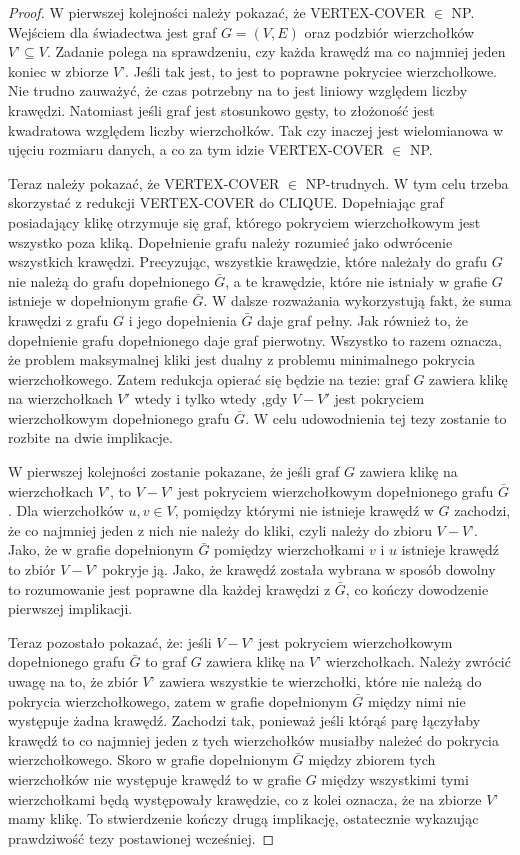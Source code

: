 \begin{proof}

W pierwszej kolejności należy pokazać, że VERTEX-COVER $\in$ NP. Wejściem dla świadectwa jest graf $G=(V,E)$ oraz podzbiór wierzchołków $V’ \subseteq V$. Zadanie polega na sprawdzeniu, czy każda krawędź ma co najmniej jeden koniec w zbiorze $V’$. Jeśli tak jest, to jest to poprawne pokryciee wierzchołkowe. Nie trudno zauważyć, że czas potrzebny na to jest liniowy względem liczby krawędzi. Natomiast jeśli graf jest stosunkowo gęsty, to złożoność jest kwadratowa względem liczby wierzchołków. Tak czy inaczej jest wielomianowa w ujęciu rozmiaru danych, a co za tym idzie VERTEX-COVER $\in$ NP.

Teraz należy pokazać, że VERTEX-COVER $\in$ NP-trudnych. W tym celu trzeba skorzystać z redukcji VERTEX-COVER do CLIQUE. Dopełniając graf posiadający klikę otrzymuje się graf, którego pokryciem wierzchołkowym jest wszystko poza kliką. Dopełnienie grafu należy rozumieć jako odwrócenie wszystkich krawędzi. Precyzując, wszystkie krawędzie, które należały do grafu $G$ nie należą do grafu dopełnionego $\bar{G}$, a te krawędzie, które nie istniały w grafie $G$ istnieje w dopełnionym grafie $\bar{G}$. W dalsze rozważania wykorzystują fakt, że suma krawędzi z grafu $G$ i jego dopełnienia $\bar{G}$ daje graf pełny. Jak również to, że dopełnienie grafu dopełnionego daje graf pierwotny. Wszystko to razem oznacza, że problem maksymalnej kliki jest dualny z problemu minimalnego pokrycia wierzchołkowego. Zatem redukcja opierać się będzie na tezie: graf $G$ zawiera klikę na wierzchołkach $V'$ wtedy i tylko wtedy ,gdy $V-V'$ jest pokryciem wierzchołkowym dopełnionego grafu $\bar{G}$. W celu udowodnienia tej tezy zostanie to rozbite na dwie implikacje.

W pierwszej kolejności zostanie pokazane, że jeśli graf $G$ zawiera klikę na wierzchołkach $V’$, to $V-V’$ jest pokryciem wierzchołkowym dopełnionego grafu $\bar{G}$. Dla wierzchołków $ u,v \in V$, pomiędzy którymi nie istnieje krawędź w $G$ zachodzi, że co najmniej jeden z nich nie należy do kliki, czyli należy do zbioru $V-V’$. Jako, że w grafie dopełnionym $\bar{G}$ pomiędzy wierzchołkami $v$ i $u$ istnieje krawędź to zbiór $V-V’$ pokryje ją. Jako, że krawędź została wybrana w sposób dowolny to rozumowanie jest poprawne dla każdej krawędzi z $\bar{G}$, co kończy dowodzenie pierwszej implikacji.

Teraz pozostało pokazać, że: jeśli $V-V’$ jest pokryciem wierzchołkowym dopełnionego grafu $\bar{G}$ to graf $G$ zawiera klikę na $V’$ wierzchołkach. Należy zwrócić uwagę na to, że zbiór $V’$ zawiera wszystkie te wierzchołki, które nie należą do pokrycia wierzchołkowego, zatem w grafie dopełnionym $\bar{G}$ między nimi nie występuje żadna krawędź. Zachodzi tak, ponieważ jeśli którąś parę łączyłaby krawędź to co najmniej jeden z tych wierzchołków musiałby należeć  do pokrycia wierzchołkowego. Skoro w grafie dopełnionym $\bar{G}$ między zbiorem tych wierzchołków nie występuje krawędź to w grafie $G$ między wszystkimi tymi wierzchołkami będą występowały krawędzie, co z kolei oznacza, że na zbiorze $V’$ mamy klikę. To stwierdzenie kończy drugą implikację, ostatecznie wykazując prawdziwość tezy postawionej wcześniej.


\end{proof}
